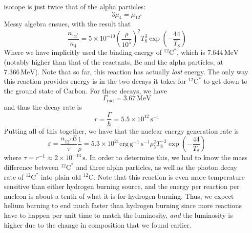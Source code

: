 \documentclass[10pt]{article}
\numberwithin{equation}{section}
\begin{document}
    isotope is just twice that of the alpha particles:
    \begin{equation}
      \label{eq:270}
      3\mu_4=\mu_{12^*}
    \end{equation}
    Messy algebra ensues, with the result that
    \begin{equation}
      \label{eq:271}
      \frac{n_{\mathrm{12^*}}}{n_4}=5\times
      10^{-10}\left(\frac{\rho}{10^5}\right)^2T_8^3\exp\left(-\frac{44}
      {T_8}\right)
    \end{equation}
    Where we have implicitly used the binding energy of
    ${}^{12}\mathrm{C}^*$, which is $7.644\,\mathrm{MeV}$ (notably
    higher than that of the reactants, Be and the alpha particles, at
    $7.366\,\mathrm{MeV}$). Note that so far, this reaction has
    actually \emph{lost} energy. The only way this reaction provides
    energy is in the two decays it takes for ${}^{12}\mathrm{C}^*$ to
    get down to the ground state of Carbon. For these decays, we have
    \begin{equation}
      \label{eq:272}
      \Gamma_{\mathrm{rad}}=3.67\,\mathrm{MeV}
    \end{equation}
    and thus the decay rate is
    \begin{equation}
      \label{eq:273}
      r=\frac{\Gamma}{\hbar}=5.5 \times 10^{12}\,\mathrm{s^{-1}}
    \end{equation}
    Putting all of this together, we have that the nuclear energy
    generation rate is
    \begin{equation}
      \label{eq:274}
      \varepsilon = \frac{n_{12^*}E}{\tau}\frac{1}{\rho}=5.3\times 10^
      {21}\mathrm{erg\,g^{-1}\,s^{-1}}\rho_5^2T_8^{-3}\exp\left(-\frac{44}
      {T_8}\right)
    \end{equation}
    where $\tau = r^{-1}\approx 2\times 10^{-13}\ \mathrm{s}$. In order to
    determine this, we had to know the mass difference between
    ${}^{12}\mathrm{C}^*$ and three alpha particles, as well as the photon
    decay rate of ${}^{12}\mathrm{C}^*$ into plain old $^{12}\mathrm{C}$. Note
    that this reaction is even more temperature sensitive than either hydrogen
    burning source, and the energy per reaction per nucleon is about a tenth of
    what it is for hydrogen burning. Thus, we expect helium burning to end much
    faster than hydrogen burning since more reactions have to happen per unit
    time to match the luminosity, \emph{and} the luminosity is higher due to
    the change in composition that we found earlier.\\
    
\end{document}
